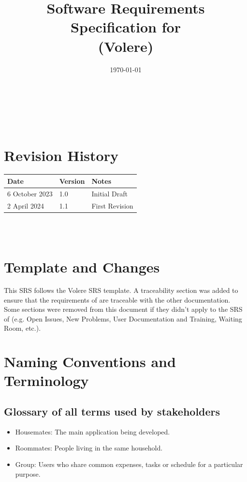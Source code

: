 \documentclass[12pt]{article}
\begin{document}
\title{Software Requirements Specification for \progname \\ (Volere)}
\author{\authname}
\date{\today}
	
\maketitle

~\newpage


\tableofcontents

~\newpage

\section*{Revision History}

\begin{tabularx}{\textwidth}{p{3cm}p{2cm}X}
\toprule {\textbf{Date}} & {\textbf{Version}} & {\textbf{Notes}}\\
\midrule
6 October 2023 & 1.0 & Initial Draft\\
2 April 2024 & 1.1 & First Revision \\
\bottomrule
\end{tabularx}

~\\

~\newpage

\section{Template and Changes}

This SRS follows the Volere SRS template. A traceability section was added to ensure that the requirements of \progname{} are traceable with the other \progname{} documentation.  Some sections were removed from this document if they didn't apply to the SRS of \progname{} (e.g. Open Issues, New Problems, User Documentation and Training, Waiting Room, etc.). 

\section{Naming Conventions and Terminology}
\subsection{Glossary of all terms used by stakeholders}
\begin{itemize}
    \item Housemates: The main application being developed.
    \item Roommates: People living in the same household.
    \item Group: Users who share common expenses, tasks or schedule for a particular purpose.
\end{itemize}
\end{document}
